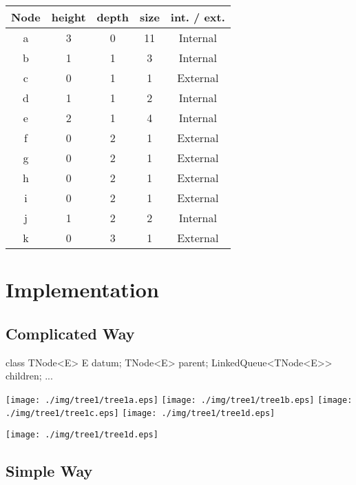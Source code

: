 \documentclass[a4paper, 9pt]{extarticle}
\begin{document}
\begin{center}
  \begin{tabular}{|c|c|c|c|c|}
    \hline
    Node & height & depth & size & int. / ext. \\
    \hline
    a & 3 & 0 & 11 & Internal \\
    b & 1 & 1 & 3  & Internal \\
    c & 0 & 1 & 1  & External \\
    \hline
    d & 1 & 1 & 2 & Internal \\
    e & 2 & 1 & 4 & Internal \\
    f & 0 & 2 & 1 & External \\
    \hline
    g & 0 & 2 & 1 & External \\
    h & 0 & 2 & 1 & External \\
    i & 0 & 2 & 1 & External \\
    \hline
    j & 1 & 2 & 2 & Internal \\
    k & 0 & 3 & 1 & External \\
    \hline
  \end{tabular}
\end{center}



\section{Implementation}


\subsection{Complicated Way}

\begin{blackboard}
class TNode<E> {
    E datum;
    TNode<E> parent;
    LinkedQueue<TNode<E>> children;
    ...
}
\end{blackboard}

\texttt{[image: ./img/tree1/tree1a.eps]}
\texttt{[image: ./img/tree1/tree1b.eps]}
\texttt{[image: ./img/tree1/tree1c.eps]}
\texttt{[image: ./img/tree1/tree1d.eps]}

\begin{center}
\texttt{[image: ./img/tree1/tree1d.eps]}
\end{center}



\subsection{Simple Way}
\end{document}
